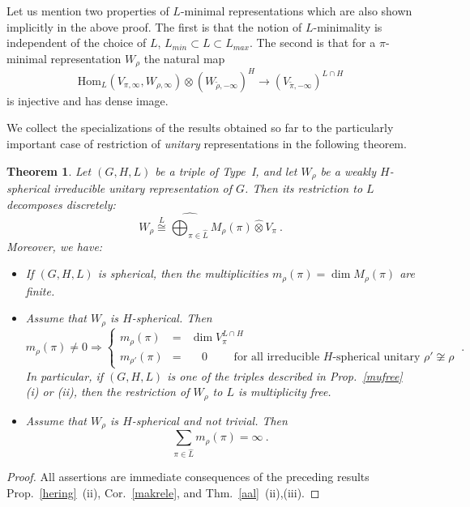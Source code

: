 \documentclass[10]{amsart}
\newtheorem{thm}{Theorem}[section]
\theoremstyle{remark}
\theoremstyle{definition}
\numberwithin{equation}{section}
\newcommand{\Hom}{\mathrm{Hom}}
\newcommand{\be}{\begin{equation}}
\begin{document}
{Let us mention two properties of $L$-minimal representations which are also shown implicitly in the above proof. The first is that the notion of $L$-minimality is independent of the
choice of $L$, $L_{min}\subset L\subset L_{max}$. The second is that for a $\pi$-minimal representation $W_\rho$ the natural map
\be\label{guru}\Hom_{L}(V_{\pi,\infty},W_{\rho,\infty})\otimes  (W_{\tilde\rho,-\infty})^H\rightarrow (V_{\tilde\pi,-\infty})^{L\cap H}
\end{equation}
is injective and has dense image.

We collect the specializations of the results obtained so far to the particularly important case  of restriction of {\em unitary} representations 
in the following theorem. 

%
\begin{thm}\label{mainbranching}
Let $(G,H,L)$ be a triple of Type~I, and let $W_\rho$ be a weakly $H$-spherical irreducible unitary representation of $G$. Then
its restriction to $L$ decomposes discretely:
$$ W_\rho\stackrel{L}{\cong}\widehat{\bigoplus_{\pi\in\widehat L}} M_\rho(\pi)\hat\otimes V_\pi\ .$$
Moreover, we have:
\begin{itemize}
\item[(a)] If $(G,H, L)$ is spherical, then the multiplicities $m_\rho(\pi)=\dim M_\rho(\pi)$ are finite.
\item[(b)] Assume that $W_\rho$ is $H$-spherical. Then 
$$m_\rho(\pi)\ne 0\Rightarrow \left\{\begin{array}{rcl}
m_\rho(\pi)&=&\dim V_\pi^{L\cap H}\\
m_{\rho'}(\pi)&=&\quad 0\qquad \mbox{ for all irreducible $H$-spherical unitary }\rho'\not\cong \rho
\end{array}\right. \ .$$
In particular, if $(G,H,L)$ is one of the triples described in Prop.~\ref{mufree}
(i) or (ii), then the restriction of $W_\rho$ to $L$ is multiplicity free.
\item[(c)]Assume that $W_\rho$ is $H$-spherical and not trivial. Then 
$$ \sum_{\pi\in\widehat L} m_\rho(\pi)=\infty\ .$$
\end{itemize}
\end{thm}
%

\begin{proof}
All assertions 
are immediate consequences of the preceding results Prop.~\ref{hering}~(ii), Cor.~\ref{makrele}, and Thm.~\ref{aal}~(ii),(iii).
\end{proof}

}
\end{document}
